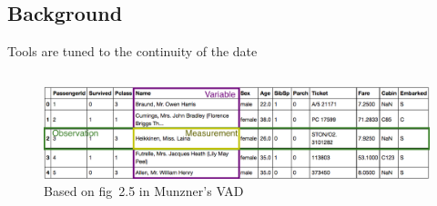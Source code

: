 \documentclass[xcolor={dvipsnames}, handout]{beamer}
\begin{document}
\subsection{Background}
\begin{frame}{Tools are tuned to the continuity of the date \cite{HeerSoftware2006,toryRethinkingVisualizationHighlevel2004}}
    \begin{columns}
        \begin{figure}
            \includegraphics[width=1\textwidth]{figures/intro/data_formatting.png}
            \caption{Based on fig~2.5 in Munzner's VAD\cite{VisualizationAnalysisDesign}}
        \end{figure}
    

\end{columns}
\end{frame}
\end{document}
